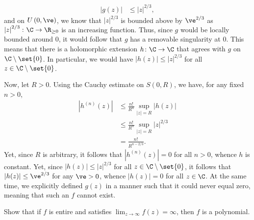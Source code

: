 \documentclass[10pt]{mypackage}
\begin{document}
\begin{solution}
\begin{enumerate}[(a)]
      \begin{align*}
        \left\vert g(z) \right\vert &\leq \left\vert z \right\vert^{2/3},
      \end{align*}
      and on $U\left( 0,\ve \right)$, we know that $\left\vert z \right\vert^{2/3}$ is bounded above by $\ve^{2/3}$ as $\left\vert z \right\vert^{2/3}\colon \C\rightarrow \R_{\geq 0}$ is an increasing function. Thus, since $g$ would be locally bounded around $0$, it would follow that $g$ has a removable singularity at $0$. This means that there is a holomorphic extension $h\colon \C\rightarrow \C$ that agrees with $g$ on $\C\setminus \set{0}$. In particular, we would have $\left\vert h(z) \right\vert \leq \left\vert z \right\vert^{2/3}$ for all $z\in \C\setminus\set{0}$.\newline

      Now, let $R > 0$. Using the Cauchy estimate on $S\left( 0,R \right)$, we have, for any fixed $n > 0$,
      \begin{align*}
        \left\vert h^{(n)}(z) \right\vert &\leq \frac{n!}{R^{n}} \sup_{\left\vert z \right\vert = R} \left\vert h(z) \right\vert\\
                                          &\leq \frac{n!}{R^{n}} \sup_{\left\vert z \right\vert = R} \left\vert z \right\vert^{2/3}\\
                                          &= \frac{n!}{R^{n-2/3}}.
      \end{align*}
      Yet, since $R$ is arbitrary, it follows that $\left\vert h^{(n)}(z) \right\vert = 0$ for all $n > 0$, whence $h$ is constant. Yet, since $\left\vert h(z) \right\vert \leq \left\vert z \right\vert^{2/3}$ for all $z \in \C\setminus \set{0}$, it follows that $\left\vert h(z) \right\vert \leq \ve^{2/3}$ for any $\ve > 0$, whence $\left\vert h(z) \right\vert = 0$ for all $z\in \C$. At the same time, we explicitly defined $g(z)$ in a manner such that it could never equal zero, meaning that such an $f$ cannot exist.
  \end{enumerate}
\end{solution}
\begin{problem}[Problem 4]
  Show that if $f$ is entire and satisfies $\lim_{z\rightarrow\infty} f\left( z \right) = \infty$, then $f$ is a polynomial.
\end{problem}
\end{document}
